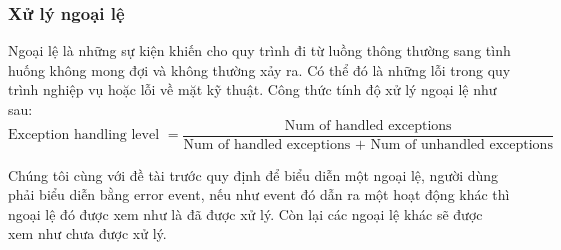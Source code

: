 \subsubsection{Xử lý ngoại lệ}
Ngoại lệ là những sự kiện khiến cho quy trình đi từ luồng thông thường sang tình huống không mong đợi và không thường xảy ra. Có thể đó là những lỗi trong quy trình nghiệp vụ hoặc lỗi về mặt kỹ thuật. Công thức tính độ xử lý ngoại lệ như sau:
\[ \text{Exception handling level } = \frac{\text{Num of handled exceptions}}{\text{Num of handled exceptions + Num of unhandled exceptions}}\]
\par
Chúng tôi cùng với đề tài trước quy định để biểu
diễn một ngoại lệ, người dùng phải biểu diễn bằng error event, nếu như event đó dẫn ra một hoạt động khác thì ngoại lệ đó được xem như là đã được xử lý. Còn lại các ngoại lệ khác sẽ được xem như chưa được xử lý.